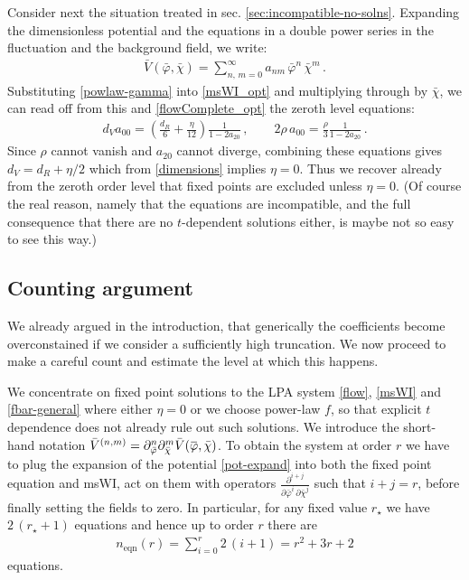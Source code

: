 \documentclass[11pt]{book} %
\newcommand{\overbar}[1]{\mkern 1.5mu\overline{\mkern-1.5mu#1\mkern-1.5mu}\mkern 1.5mu}
\newcommand{\bp}{\overbar \varphi}
\newcommand{\bc}{\bar \chi}
\numberwithin{equation}{chapter}
\begin{document}
Consider next the situation treated in sec. \ref{sec:incompatible-no-solns}.
Expanding the dimensionless potential and the equations in a double power series in the fluctuation and
the background field, we write:
\begin{align}
  \label{pot-expand}
  \bar V(\bar\varphi,\bar\chi) = \sum_{n,\,m=0}^{\infty} a_{nm} \, \bar\varphi^n \, \bar\chi^m\,.
\end{align}
Substituting \eqref{powlaw-gamma} into \eqref{msWI_opt} and multiplying through by $\bc$,
we can read off from this and \eqref{flowComplete_opt} the zeroth level equations:
\begin{align}
  d_V a_{00} = \left(  \frac{d_R}{6} + \frac{\eta}{12} \right) \frac{1}{1 -  2a_{20}}\,,\qquad 2\rho\, a_{00} = \frac{\rho}{3} \frac{1}{1 -  2a_{20}}\,.
\end{align}
Since $\rho$ cannot vanish and $a_{20}$ cannot diverge,
combining these equations gives $d_V = d_R+\eta/2$ which from \eqref{dimensions} implies $\eta=0$.
Thus we recover already from the zeroth order level that fixed points are excluded unless $\eta=0$.
(Of course the real reason, namely that the equations are incompatible,
and the full consequence that there are no $t$-dependent solutions either,
is maybe not so easy to see this way.)


\subsection{Counting argument}\label{sec:counting}

We already argued in the introduction, that generically the coefficients become overconstained if we
consider a sufficiently high truncation. We now proceed to make a careful count and estimate the
level at which this happens.

We concentrate on fixed point solutions to the LPA system \eqref{flow},
\eqref{msWI} and \eqref{fbar-general} where either $\eta=0$ or we choose power-law $f$,
so that explicit $t$ dependence does not already rule out such solutions.
We introduce the short-hand notation
$\bar V ^{(n,m)}=\partial_{\bar \varphi}^n \partial_{\bar \chi}^m \bar V(\bp,\bc)$.
To obtain the system at order $r$ we have to plug the expansion of the potential \eqref{pot-expand}
into both the fixed point equation and msWI, act on them with operators
$\frac{\partial^{i+j}}{\partial \bar\varphi^i \, \partial \bar\chi^j}$ such that $i+j=r$,
before finally setting the fields to zero.
In particular, for any fixed value $r_{\star}$ we have $2 \, (r_{\star}+1)$ equations
and hence up to order $r$ there are
\begin{align}
  \label{number_eqns}
  n_{\text{eqn}}(r) = \sum_{i=0}^{r} 2\,(i+1) = r^2 + 3r + 2
\end{align}
equations.
\end{document}
